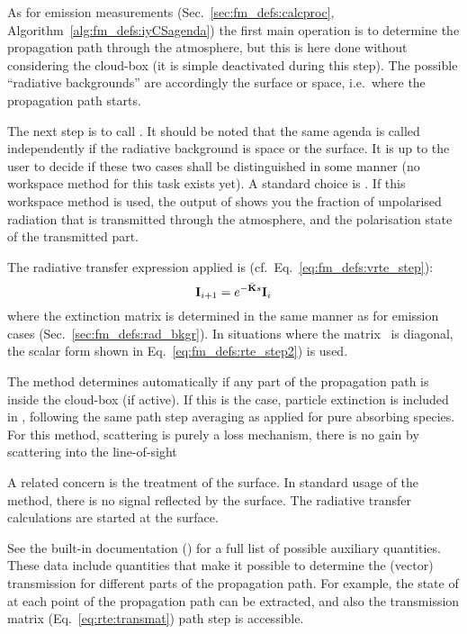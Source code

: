 As for emission measurements (Sec.~\ref{sec:fm_defs:calcproc},
Algorithm~\ref{alg:fm_defs:iyCSagenda}) the first main operation is to
determine the propagation path through the atmosphere, but this is here done
without considering the cloud-box (it is simple deactivated during this step).
The possible ``radiative backgrounds'' are accordingly the surface or space,
i.e.\ where the propagation path starts. 

The next step is to call . It should be
noted that the same agenda is called independently if the radiative background
is space or the surface. It is up to the user to decide if these two cases
shall be distinguished in some manner (no workspace method for this task exists
yet). A standard choice  is
. If this workspace method is used, the output of
 shows you the fraction of unpolarised
radiation that is transmitted through the atmosphere, and the polarisation
state of the transmitted part. 

The radiative transfer expression applied is
(cf.~Eq.~\ref{eq:fm_defs:vrte_step}):
\begin{equation}
  \label{eq:trans:vrte}
  {\bf I}_{i+1} = e^{-\bar{{\bf K}}s} {\bf I}_i 
\end{equation}
where the extinction matrix is determined in the same manner as for emission
cases (Sec.~\ref{sec:fm_defs:rad_bkgr}). In situations where the matrix
\ExtMat\ is diagonal, the scalar form shown in Eq.~\ref{eq:fm_defs:rte_step2})
is used.

The method determines automatically if any part of the propagation path is
inside the cloud-box (if active). If this is the case, particle extinction is
included in \ExtMat, following the same path step averaging as applied for
pure absorbing species. For this method, scattering is purely a loss mechanism,
there is no gain by scattering into the line-of-sight

A related concern is the treatment of the surface. In standard usage of the
method, there is no signal reflected by the surface. The radiative transfer
calculations are started at the surface.

See the built-in documentation () for a full
list of possible auxiliary quantities. These data include quantities that make
it possible to determine the (vector) transmission for different parts of the
propagation path. For example, the state of  at each point of
the propagation path can be extracted, and also the transmission matrix
(Eq.~\ref{eq:rte:transmat}) path step is accessible.





